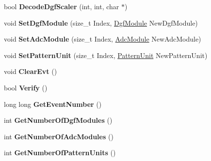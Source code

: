 \begin{DoxyCompactItemize}
\item 
\hypertarget{class_unpacked_event_a7a965ea80344bfb2957dc68495085bd4}{bool {\bfseries Decode\-Dgf\-Scaler} (int, int, char $\ast$)}\label{class_unpacked_event_a7a965ea80344bfb2957dc68495085bd4}

\item 
\hypertarget{class_unpacked_event_a8a2410a51de9fdfa467866b4d041cd51}{void {\bfseries Set\-Dgf\-Module} (size\-\_\-t Index, \hyperlink{class_dgf_module}{Dgf\-Module} New\-Dgf\-Module)}\label{class_unpacked_event_a8a2410a51de9fdfa467866b4d041cd51}

\item 
\hypertarget{class_unpacked_event_ad0cf4ae46cfc609594ca67b55a98c2fc}{void {\bfseries Set\-Adc\-Module} (size\-\_\-t Index, \hyperlink{class_adc_module}{Adc\-Module} New\-Adc\-Module)}\label{class_unpacked_event_ad0cf4ae46cfc609594ca67b55a98c2fc}

\item 
\hypertarget{class_unpacked_event_a44f6c5ae5cc6e6103be86a776730b603}{void {\bfseries Set\-Pattern\-Unit} (size\-\_\-t Index, \hyperlink{class_pattern_unit}{Pattern\-Unit} New\-Pattern\-Unit)}\label{class_unpacked_event_a44f6c5ae5cc6e6103be86a776730b603}

\item 
\hypertarget{class_unpacked_event_a664861c77ddac5439a82b376982a82d4}{void {\bfseries Clear\-Evt} ()}\label{class_unpacked_event_a664861c77ddac5439a82b376982a82d4}

\item 
\hypertarget{class_unpacked_event_a99fe4883b6afaeeb7323942dc4c2df35}{bool {\bfseries Verify} ()}\label{class_unpacked_event_a99fe4883b6afaeeb7323942dc4c2df35}

\item 
\hypertarget{class_unpacked_event_ad041cb52b49e07a5abd74956f25d8d6e}{long long {\bfseries Get\-Event\-Number} ()}\label{class_unpacked_event_ad041cb52b49e07a5abd74956f25d8d6e}

\item 
\hypertarget{class_unpacked_event_a8411c29339ab3d12ead8dc040f5eb124}{int {\bfseries Get\-Number\-Of\-Dgf\-Modules} ()}\label{class_unpacked_event_a8411c29339ab3d12ead8dc040f5eb124}

\item 
\hypertarget{class_unpacked_event_a17961a5669eeee7f7d8e864d7d59e031}{int {\bfseries Get\-Number\-Of\-Adc\-Modules} ()}\label{class_unpacked_event_a17961a5669eeee7f7d8e864d7d59e031}

\item 
\hypertarget{class_unpacked_event_a6513a1facbdd44bc401e3ddb1d4c7e0e}{int {\bfseries Get\-Number\-Of\-Pattern\-Units} ()}\label{class_unpacked_event_a6513a1facbdd44bc401e3ddb1d4c7e0e}


\end{DoxyCompactItemize}
